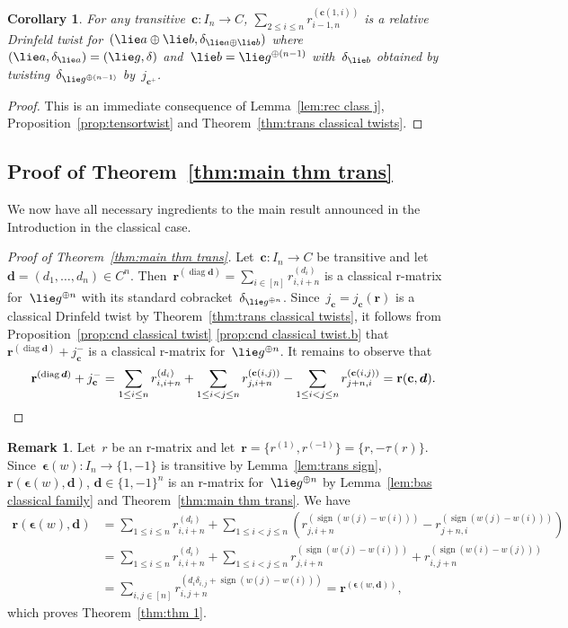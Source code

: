 \documentclass[12pt, reqno]{amsart}
\newtheorem{corollary}[theorem]{Corollary}
\theoremstyle{definition}
\newtheorem{remark}[theorem]{Remark}
\numberwithin{equation}{section}
\DeclareMathOperator*{\diag}{diag}
\DeclareMathOperator{\sign}{sign}
\newcommand{\sgna}[1]{\boldsymbol{\epsilon}(#1)}
\begin{document}
\begin{corollary}
For any transitive~$\mathbf c:I_n\to C$, $\sum\limits_{2\le i\le n} r_{i-1,n}^{(\mathbf c(1,i))}$ is a relative Drinfeld twist 
for~$(\lie a\oplus \lie b,\delta_{\lie a\oplus \lie b})$ where~$(\lie a,\delta_{\lie a})=(\lie g,\delta)$ and~$\lie b=\lie g^{\oplus (n-1)}$ with~$\delta_{\lie b}$ obtained by twisting~$\delta_{\lie g^{\oplus(n-1)}}$ by~$j_{\mathbf c^+}$.
\end{corollary}
\begin{proof}
This is an immediate consequence of Lemma~\ref{lem:rec class j}, Proposition~\ref{prop:tensortwist}
and Theorem~\ref{thm:trans classical twists}.
\end{proof}

\subsection{Proof of Theorem~\ref{thm:main thm trans}}\label{subs:pf m thm 1}
We now have all necessary ingredients to the main 
result announced in the Introduction in the classical case.
\begin{proof}[Proof of Theorem~\ref{thm:main thm trans}]
Let~$\mathbf c:I_n\to C$ be transitive 
and let~$\boldsymbol{d}=(d_1,\dots,d_n)\in C^n$.
Then~$\mathbf r^{(\diag \boldsymbol d)}=\sum_{i\in [n]} r_{i,i+n}^{(d_i)}$
is a classical r-matrix for~$\lie g^{\oplus n}$ 
with its standard cobracket~$\delta_{\lie g^{\oplus n}}$.
Since~$j_{\mathbf c}=j_{\mathbf c}(\mathbf r)$ is a classical Drinfeld twist
by Theorem~\ref{thm:trans classical twists},
it follows from Proposition~\ref{prop:cnd classical twist}
\ref{prop:cnd classical twist.b} that~$\mathbf r^{(\diag\boldsymbol d)}+j_{\mathbf c}^-$ is a classical r-matrix for~$\lie g^{\oplus n}$. It remains to observe that
\begin{equation*}
\mathbf r^{(\diag\boldsymbol d)}+j_{\mathbf c}^-=
\sum_{1\le i\le n} r_{i,i+n}^{(d_i)}+
\sum_{1\le i<j\le n} r_{j,i+n}^{(\mathbf c(i,j))}
-\sum_{1\le i<j\le n} r_{j+n,i}^{(\mathbf c(i,j))}
=\mathbf r(\mathbf c,\boldsymbol d).\qedhere
\end{equation*}
\end{proof}
\begin{remark}\label{rem:pf thm 1.1}
Let~$r$ be an r-matrix and let~$\mathbf r=\{r^{(1)},r^{(-1)}\}=\{r,-\tau(r)\}$. 
Since~$\sgna w:I_n\to \{1,-1\}$ is transitive 
by Lemma~\ref{lem:trans sign}, 
$\mathbf r(\sgna w,\boldsymbol d)$,
$\boldsymbol{d}\in\{1,-1\}^n$ is an r-matrix for~$\lie g^{\oplus n}$ by Lemma~\ref{lem:bas classical family} and Theorem~\ref{thm:main thm trans}.
We have 
\begin{align*}
\mathbf r(\sgna w,\boldsymbol{d})&=
\sum_{1\le i\le n} r_{i,i+n}^{(d_i)}+
\sum_{1\le i<j\le n} (r_{j,i+n}^{(\sign(w(j)-w(i)))}-
r_{j+n,i}^{(\sign(w(j)-w(i)))})
\\
&=\sum_{1\le i\le n} r_{i,i+n}^{(d_i)}+
\sum_{1\le i<j\le n} r_{j,i+n}^{(\sign(w(j)-w(i)))}+
r_{i,j+n}^{(\sign(w(i)-w(j)))}\\
&=\sum_{i,j\in[n]} r_{i,j+n}^{(d_i\delta_{i,j}+\sign(w(j)-w(i)))}=
\mathbf r^{(\sgna{w,\boldsymbol{d}})},
\end{align*}
which proves Theorem~\ref{thm:thm 1}.
\end{remark}
\end{document}
